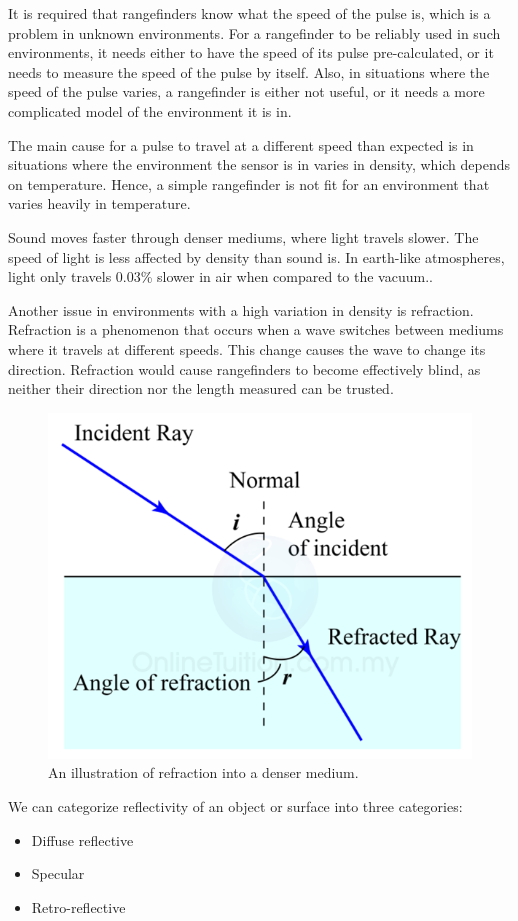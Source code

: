 It is required that rangefinders know what the speed of the pulse is, which is a problem in unknown environments. For a rangefinder to be reliably used in such environments, it needs either to have the speed of its pulse pre-calculated, or it needs to measure the speed of the pulse by itself. Also, in situations where the speed of the pulse varies, a rangefinder is either not useful, or it needs a more complicated model of the environment it is in.

The main cause for a pulse to travel at a different speed than expected is in situations where the environment the sensor is in varies in density, which depends on temperature\cite{refraction}. Hence, a simple rangefinder is not fit for an environment that varies heavily in temperature.

Sound moves faster through denser mediums, where light travels slower. The speed of light is less affected by density than sound is. In earth-like atmospheres, light only travels 0.03\% slower in air when compared to the vacuum.\cite{refraction}\cite{speedOfSound}.

Another issue in environments with a high variation in density is refraction. Refraction is a phenomenon that occurs when a wave switches between mediums where it travels at different speeds. This change causes the wave to change its direction\cite{snell}. Refraction would cause rangefinders to become effectively blind, as neither their direction nor the length measured can be trusted.

\begin{figure}[H]
	\centering
	\includegraphics[width=.4\linewidth]{images/refraction.png}
	\caption{An illustration of refraction into a denser medium.\cite{refracfig}}
	\label{fig:refractionIMG}
\end{figure}

We can categorize reflectivity of an object or surface into three categories:\cite{reflectivity}

\begin{itemize}
	\item Diffuse reflective
	\item Specular
	\item Retro-reflective
\end{itemize}

